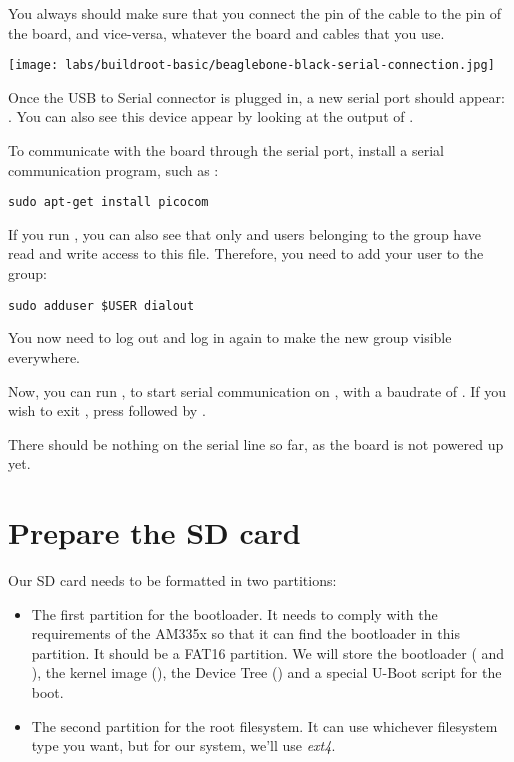 You always should make sure that you connect the  pin of the
cable to the  pin of the board, and vice-versa, whatever the
board and cables that you use.

\begin{center}
\texttt{[image: labs/buildroot-basic/beaglebone-black-serial-connection.jpg]}
\end{center}

Once the USB to Serial connector is plugged in, a new serial port
should appear: .  You can also see this device
appear by looking at the output of .

To communicate with the board through the serial port, install a
serial communication program, such as :

\begin{verbatim}
sudo apt-get install picocom
\end{verbatim}

If you run , you can also see that only
 and users belonging to the  group have read
and write access to this file. Therefore, you need to add your user to
the  group:

\begin{verbatim}
sudo adduser $USER dialout
\end{verbatim}

You now need to log out and log in again to make the new group visible
everywhere.

Now, you can run , to start
serial communication on , with a baudrate of
. If you wish to exit , press
\code{[Ctrl][a]} followed by \code{[Ctrl][x]}.

There should be nothing on the serial line so far, as the board is not
powered up yet.

\section{Prepare the SD card}

Our SD card needs to be formatted in two partitions:

\begin{itemize}

\item The first partition for the bootloader. It needs to comply with
  the requirements of the AM335x so that it can find the bootloader in
  this partition. It should be a FAT16 partition. We will store the
  bootloader ( and ), the kernel image
  (), the Device Tree () and a
  special U-Boot script for the boot.

\item The second partition for the root filesystem. It can use
  whichever filesystem type you want, but for our system, we'll use
  {\em ext4}.

\end{itemize}

